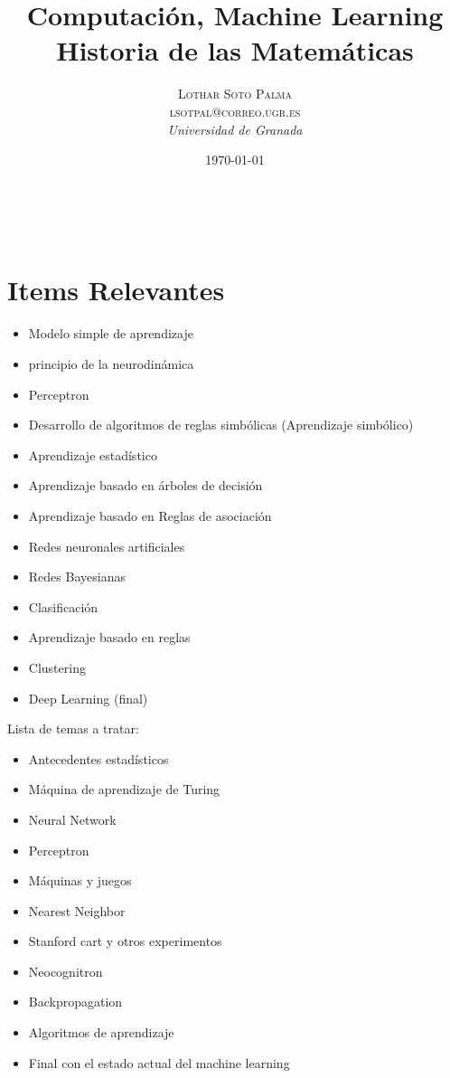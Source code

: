 \documentclass[a4paper, 11pt]{article} %
\title{\textbf{Computación, Machine Learning}\\ %
\vspace{20 pt}
Historia de las Matemáticas} %
\author{\textsc{Lothar Soto Palma\\
lsotpal@correo.ugr.es} %
\\{\textit{Universidad de Granada}}} %
\date{\today} %
\makeatletter
\renewcommand{\maketitle}{ %
\begin{center} %
{\Huge\@title} %
\end{center}

\vspace{20pt} %

\begin{flushright} %
{\large\@author} %
\\\@date %

\vspace{40pt} %
\end{flushright}
\renewcommand{\baselinestretch}{0.5}

}
\makeatother
\begin{document}
	\maketitle
	\tableofcontents
	\listoffigures
	\section{Items Relevantes}
		\begin{itemize}
			\item Modelo simple de aprendizaje
			\item principio de la neurodinámica
			\item Perceptron
			\item Desarrollo de algoritmos de reglas simbólicas (Aprendizaje simbólico)
			\item Aprendizaje estadístico
			\item Aprendizaje basado en árboles de decisión
			\item Aprendizaje basado en Reglas de asociación
			\item Redes neuronales artificiales
			\item Redes Bayesianas
			\item Clasificación
			\item Aprendizaje basado en reglas
			\item Clustering
			\item Deep Learning (final)
		\end{itemize}
		Lista de temas a tratar:
		\begin{itemize}
			\item Antecedentes estadísticos
			\item Máquina de aprendizaje de Turing
			\item Neural Network
			\item Perceptron
			\item Máquinas y juegos
			\item Nearest Neighbor
			\item Stanford cart y otros experimentos
			\item Neocognitron
			\item Backpropagation
			\item Algoritmos de aprendizaje
			\item Final con el estado actual del machine learning
		\end{itemize}
\end{document}
